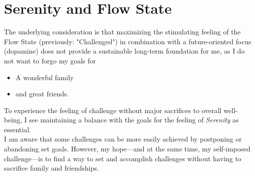  

\section{Serenity and Flow State}

The underlying consideration is that maximizing the stimulating feeling of the Flow State (previously: "Challenged") in combination with a future-oriented focus (dopamine) does not provide a sustainable long-term foundation for me, as I do not want to forgo my goals for 
\begin{itemize}
    \item A wonderful family
    \item and great friends.
\end{itemize}

To experience the feeling of challenge without major sacrifices to overall well-being, I see maintaining a balance with the goals for the feeling of \textit{Serenity} as essential.\\

I am aware that some challenges can be more easily achieved by postponing or abandoning set goals. However, my hope—and at the same time, my self-imposed challenge—is to find a way to set and accomplish challenges without having to sacrifice family and friendships.

